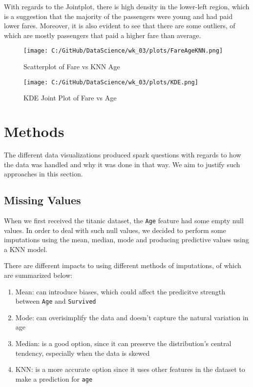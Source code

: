 \documentclass[a4paper, twocolumn]{article}
\begin{document}
With regards to the Jointplot, there is high density in the lower-left region, which is a suggestion that the 
majority of the passengers were young and had paid lower fares. Moreover, it is also evident to see that there
are some outliers, of which are mostly passengers that paid a higher fare than average. 

\begin{figure}[h!] 
    \centering
    \noindent
    \texttt{[image: C:/GitHub/DataScience/wk\_03/plots/FareAgeKNN.png]}  
    \caption{Scatterplot of Fare vs KNN Age } 
\end{figure}

\begin{figure}[h!] 
    \centering
    \noindent
    \texttt{[image: C:/GitHub/DataScience/wk\_03/plots/KDE.png]}  
    \caption{KDE Joint Plot of Fare vs Age} 
\end{figure}


\section{Methods}
The different data visualizations produced spark questions with regards to how the data was handled and why it was
done in that way. We aim to justify such approaches in this section.

\subsection{Missing Values}
When we first received the titanic dataset, the \texttt{Age} feature had some empty null values. In order to deal
with such null values, we decided to perform some imputations using the mean, median, mode and producing predictive
values using a KNN model.

There are different impacts to using different methods of imputations, of which are summarized below:
\begin{enumerate}
    \item Mean: can introduce biases, which could affect the predicitve strength between \texttt{Age} and 
    \texttt{Survived}
    \item Mode: can overisimplify the data and doesn't capture the natural variation in age
    \item Median: is a good option, since it can preserve the distribution's central tendency, especially when the 
    data is skewed
    \item KNN: is a more accurate option since it uses other features in the dataset to make a prediction for 
    \texttt{age}
\end{enumerate}
\end{document}
